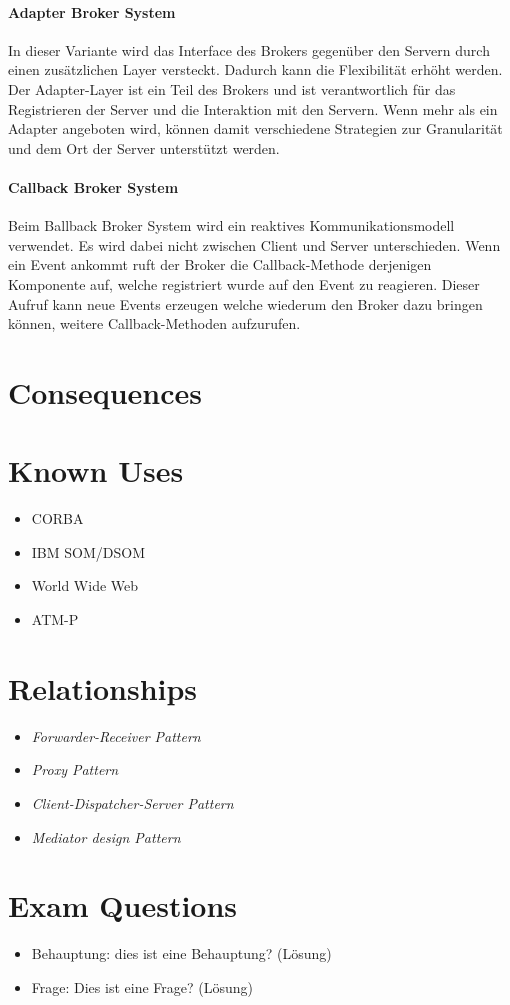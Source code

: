 \paragraph{Adapter Broker System}
In dieser Variante wird das Interface des Brokers gegenüber den Servern durch einen zusätzlichen Layer versteckt. Dadurch kann die Flexibilität erhöht werden. Der Adapter-Layer ist ein Teil des Brokers und ist verantwortlich für das Registrieren der Server und die Interaktion mit den Servern. Wenn mehr als ein Adapter angeboten wird, können damit verschiedene Strategien zur Granularität und dem Ort der Server unterstützt werden.

\paragraph{Callback Broker System}
Beim Ballback Broker System wird ein reaktives Kommunikationsmodell verwendet. Es wird dabei nicht zwischen Client und Server unterschieden. Wenn ein Event ankommt ruft der Broker die Callback-Methode derjenigen Komponente auf, welche registriert wurde auf den Event zu reagieren. Dieser Aufruf kann neue Events erzeugen welche wiederum den Broker dazu bringen können, weitere Callback-Methoden aufzurufen.

\section{Consequences}
\begin{itemize}
\end{itemize}


\section{Known Uses}
\begin{itemize}
	\item CORBA
	\item IBM SOM/DSOM
	\item World Wide Web
	\item ATM-P
\end{itemize}

\section{Relationships}
\begin{itemize}
	\item \textit{Forwarder-Receiver Pattern}
	\item \textit{Proxy Pattern} 
	\item \textit{Client-Dispatcher-Server Pattern}
	\item \textit{Mediator design Pattern} 
\end{itemize}

\section{Exam Questions}
\begin{itemize}
	\item Behauptung: dies ist eine Behauptung? (Lösung)
    \item Frage: Dies ist eine Frage? (Lösung)
\end{itemize}
